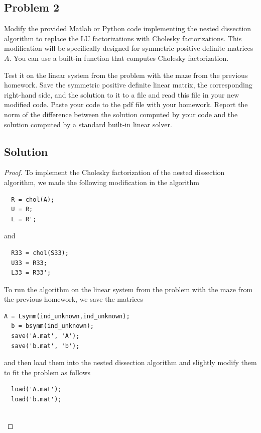 \documentclass[12pt]{report}
\begin{document}
\begin{problem}%
\subsection*{Problem 2}

Modify the provided Matlab or Python code implementing the nested dissection algorithm to replace the LU factorizations with Cholesky factorizations. This modification will be specifically designed for symmetric positive definite matrices $A$. You can use a built-in function that computes Cholesky factorization. 

\noindent
Test it on the linear system from the problem with the maze from the previous homework. Save the symmetric positive definite linear matrix, the corresponding right-hand side, and the solution to it to a file and read this file in your new modified code. Paste your code to the pdf file with your homework. Report the norm of the difference between the solution computed by your code and the solution computed by a standard built-in linear solver.

\subsection*{Solution}
\begin{proof}

To implement the Cholesky factorization of the nested dissection algorithm, we made the following modification in the algorithm
\begin{lstlisting}[style=Matlab-editor]
  %[L,U] = lu(A);
  R = chol(A);
  U = R;
  L = R';
\end{lstlisting}
and
\begin{lstlisting}[style=Matlab-editor]
  %[L33,U33] = lu(S33);
  R33 = chol(S33);
  U33 = R33;
  L33 = R33';
\end{lstlisting}
To run the algorithm on the linear system from the problem with the maze from the previous homework, we save the matrices
\begin{lstlisting}[style=Matlab-editor]
  A = Lsymm(ind_unknown,ind_unknown); 
  b = bsymm(ind_unknown);
  save('A.mat', 'A');
  save('b.mat', 'b');
\end{lstlisting}
and then load them into the nested dissection algorithm and slightly modify them to fit the problem as follows
\begin{lstlisting}[style=Matlab-editor]
  % A,b from maze question:
  load('A.mat');
  load('b.mat');
  

\end{lstlisting}
\end{proof}
\end{problem}
\end{document}
